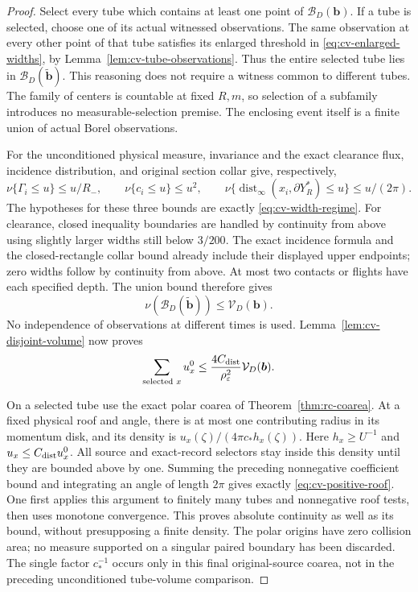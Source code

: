 \begin{proof}
Select every tube which contains at least one point of
$\mathcal B_D(\boldsymbol b)$.  If a tube is selected, choose one
of its actual witnessed observations.  The same observation at
every other point of that tube satisfies its enlarged threshold
in \eqref{eq:cv-enlarged-widths}, by
Lemma~\ref{lem:cv-tube-observations}.  Thus the entire selected
tube lies in $\mathcal B_D(\widetilde{\boldsymbol b})$.
This reasoning does not require a witness common to different
tubes.  The family of centers is countable at fixed $R,m$, so
selection of a subfamily introduces no measurable-selection premise.
The enclosing event itself is a finite union of actual Borel
observations.

For the unconditioned physical measure, invariance and the exact
clearance flux, incidence distribution, and original section collar
give, respectively,
\[
 \nu\{\Gamma_i\le u\}\le u/R_-,\qquad
 \nu\{c_i\le u\}\le u^2,\qquad
 \nu\{\operatorname{dist}_\infty(x_i,\partial Y_R^*)\le u\}
                                                     \le u/(2\pi).
\]
The hypotheses for these three bounds are exactly
\eqref{eq:cv-width-regime}.  For clearance, closed inequality
boundaries are handled by continuity from above using slightly
larger widths still below $3/200$.  The exact incidence formula
and the closed-rectangle collar bound already include their
displayed upper endpoints; zero widths follow by continuity from
above.  At most two contacts or flights
have each specified depth.  The union bound therefore gives
\[
 \nu(\mathcal B_D(\widetilde{\boldsymbol b}))
                                      \le\mathcal V_D(\boldsymbol b).
\]
No independence of observations at different times is used.
Lemma~\ref{lem:cv-disjoint-volume} now proves
\[
 \sum_{\text{selected }x}u_x^0
    \le\frac{4C_{\rm dist}}{\rho_\varepsilon^2}
                                  \mathcal V_D(\boldsymbol b).
\]

On a selected tube use the exact polar coarea of
Theorem~\ref{thm:rc-coarea}.  At a fixed physical roof and angle,
there is at most one contributing radius in its momentum disk,
and its density is $u_x(\zeta)/(4\pi c_*h_x(\zeta))$.
Here $h_x\ge U^{-1}$ and $u_x\le C_{\rm dist}u_x^0$.
All source and exact-record selectors stay inside this density
until they are bounded above by one.  Summing the preceding
nonnegative coefficient bound and integrating an angle of length
$2\pi$ gives exactly \eqref{eq:cv-positive-roof}.
One first applies this argument to finitely many tubes and
nonnegative roof tests, then uses monotone convergence.  This proves
absolute continuity as well as its bound, without presupposing a
finite density.  The polar origins have zero collision area; no
measure supported on a singular paired boundary has been discarded.
The single factor $c_*^{-1}$ occurs only in this final original-source
coarea, not in the preceding unconditioned tube-volume comparison.
\end{proof}

